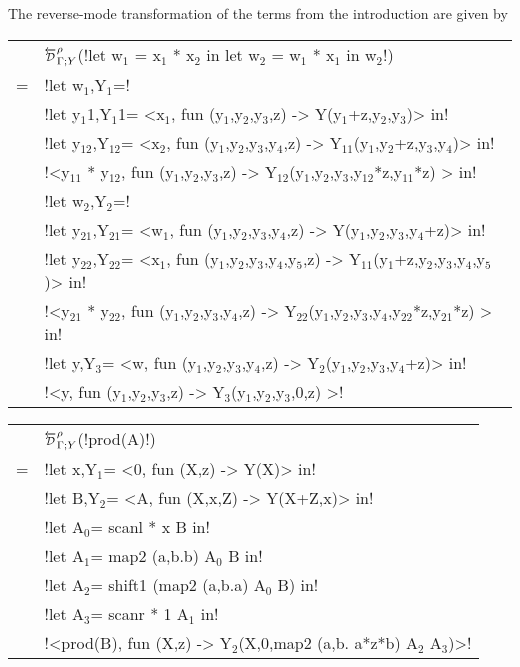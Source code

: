 \begin{example}
    The reverse-mode transformation of the terms from the introduction are given by

    \begin{tabular}{c l}
        &$\directD{\rho}{\Gamma}{Y}$(!let w$_1$ = x$_1$ * x$_2$ in let w$_2$ = w$_1$ * x$_1$ in w$_2$!) \\
        =& !let w$_1$,Y$_1$=!\\
        & \quad\quad !let y$_1$1,Y$_1$1= <x$_1$, fun (y$_1$,y$_2$,y$_3$,z) -> Y(y$_1$+z,y$_2$,y$_3$)> in! \\
        & \quad\quad !let y$_{12}$,Y$_{12}$= <x$_{2}$, fun (y$_{1}$,y$_{2}$,y$_{3}$,y$_{4}$,z) -> Y$_{11}$(y$_{1}$,y$_{2}$+z,y$_{3}$,y$_{4}$)> in! \\
        & \quad\quad !<y$_{11}$ * y$_{12}$, fun (y$_{1}$,y$_{2}$,y$_{3}$,z) -> Y$_{12}$(y$_{1}$,y$_{2}$,y$_{3}$,y$_{12}$*z,y$_{11}$*z) > in! \\
        & !let w$_{2}$,Y$_{2}$=!\\
        & \quad\quad !let y$_{21}$,Y$_{21}$= <w$_{1}$, fun (y$_{1}$,y$_{2}$,y$_{3}$,y$_{4}$,z) -> Y(y$_{1}$,y$_{2}$,y$_{3}$,y$_{4}$+z)> in! \\
        & \quad\quad !let y$_{22}$,Y$_{22}$= <x$_{1}$, fun (y$_{1}$,y$_{2}$,y$_{3}$,y$_{4}$,y$_{5}$,z) -> Y$_{11}$(y$_{1}$+z,y$_{2}$,y$_{3}$,y$_{4}$,y$_{5}$)> in! \\
        & \quad\quad !<y$_{21}$ * y$_{22}$, fun (y$_{1}$,y$_{2}$,y$_{3}$,y$_{4}$,z) -> Y$_{22}$(y$_{1}$,y$_{2}$,y$_{3}$,y$_{4}$,y$_{22}$*z,y$_{21}$*z) > in! \\
        & !let y,Y$_{3}$= <w, fun (y$_{1}$,y$_{2}$,y$_{3}$,y$_{4}$,z) -> Y$_{2}$(y$_{1}$,y$_{2}$,y$_{3}$,y$_{4}$+z)> in! \\
        & !<y, fun (y$_{1}$,y$_{2}$,y$_{3}$,z) -> Y$_{3}$(y$_{1}$,y$_{2}$,y$_{3}$,0,z) >!
    \end{tabular}
    \medskip

    \begin{tabular}{c l}
        &$\directD{\rho}{\Gamma}{Y}$(!prod(A)!) \\
        =& !let x,Y$_{1}$= <0, fun (X,z) -> Y(X)> in! \\
        & !let B,Y$_{2}$= <A, fun (X,x,Z) -> Y(X+Z,x)> in!\\
        & !let A$_{0}$= scanl * x B in!\\
        & !let A$_{1}$= map2 (a,b.b) A$_{0}$ B in!\\
        & !let A$_{2}$= shift1 (map2 (a,b.a) A$_{0}$ B) in!\\
        & !let A$_{3}$= scanr * 1 A$_{1}$ in!\\
        & !<prod(B), fun (X,z) -> Y$_{2}$(X,0,map2 (a,b. a*z*b) A$_{2}$ A$_{3}$)>! 
    \end{tabular}
\end{example}

